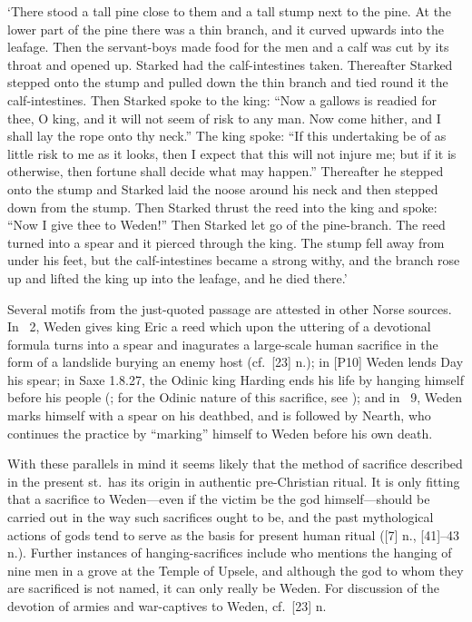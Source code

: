 {‘There stood a tall pine close to them and a tall stump next to the pine.  At the lower part of the pine there was a thin branch, and it curved upwards into the leafage.  Then the servant-boys made food for the men and a calf was cut by its throat and opened up.  Starked had the calf-intestines taken.  Thereafter Starked stepped onto the stump and pulled down the thin branch and tied round it the calf-intestines.  Then Starked spoke to the king: “Now a gallows is readied for thee, O king, and it will not seem of risk to any man.  Now come hither, and I shall lay the rope onto thy neck.” The king spoke: “If this undertaking be of as little risk to me as it looks, then I expect that this will not injure me; but if it is otherwise, then fortune shall decide what may happen.”  Thereafter he stepped onto the stump and Starked laid the noose around his neck and then stepped down from the stump.  Then Starked thrust the reed into the king and spoke: “Now I give thee to Weden!”  Then Starked let go of the pine-branch.  The reed turned into a spear and it pierced through the king.  The stump fell away from under his feet, but the calf-intestines became a strong withy, and the branch rose up and lifted the king up into the leafage, and he died there.’

Several motifs from the just-quoted passage are attested in other Norse sources.  In \StyrbjarnarThattr\ 2, Weden gives king Eric a reed which upon the uttering of a devotional formula turns into a spear and inagurates a large-scale human sacrifice in the form of a landslide burying an enemy host (cf.~[23] n.); in [P10] Weden lends Day his spear; in Saxe 1.8.27, the Odinic king Harding ends his life by hanging himself before his people (\cite[77]{Saxo2015}; for the Odinic nature of this sacrifice, see \cite[1158, 1162, 1174--76]{Schjodt2020Odin}); and in \YnglingaSaga\ 9, Weden marks himself with a spear on his deathbed, and is followed by Nearth, who continues the practice by “marking” himself to Weden before his own death.

With these parallels in mind it seems likely that the method of sacrifice described in the present st.~has its origin in authentic pre-Christian ritual.  It is only fitting that a sacrifice to Weden---even if the victim be the god himself---should be carried out in the way such sacrifices ought to be, and the past mythological actions of gods tend to serve as the basis for present human ritual ([7] n., [41]--43 n.).  Further instances of hanging-sacrifices include \textcite[208]{Tschan2002} who mentions the hanging of nine men in a grove at the Temple of Upsele, and although the god to whom they are sacrificed is not named, it can only really be Weden.  For discussion of the devotion of armies and war-captives to Weden, cf.~[23] n.

}
